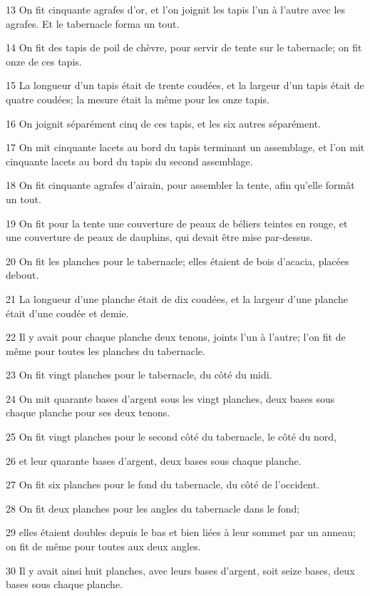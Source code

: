 \par 13 On fit cinquante agrafes d'or, et l'on joignit les tapis l'un à l'autre avec les agrafes. Et le tabernacle forma un tout.
\par 14 On fit des tapis de poil de chèvre, pour servir de tente sur le tabernacle; on fit onze de ces tapis.
\par 15 La longueur d'un tapis était de trente coudées, et la largeur d'un tapis était de quatre coudées; la mesure était la même pour les onze tapis.
\par 16 On joignit séparément cinq de ces tapis, et les six autres séparément.
\par 17 On mit cinquante lacets au bord du tapis terminant un assemblage, et l'on mit cinquante lacets au bord du tapis du second assemblage.
\par 18 On fit cinquante agrafes d'airain, pour assembler la tente, afin qu'elle formât un tout.
\par 19 On fit pour la tente une couverture de peaux de béliers teintes en rouge, et une couverture de peaux de dauphins, qui devait être mise par-dessus.
\par 20 On fit les planches pour le tabernacle; elles étaient de bois d'acacia, placées debout.
\par 21 La longueur d'une planche était de dix coudées, et la largeur d'une planche était d'une coudée et demie.
\par 22 Il y avait pour chaque planche deux tenons, joints l'un à l'autre; l'on fit de même pour toutes les planches du tabernacle.
\par 23 On fit vingt planches pour le tabernacle, du côté du midi.
\par 24 On mit quarante bases d'argent sous les vingt planches, deux bases sous chaque planche pour ses deux tenons.
\par 25 On fit vingt planches pour le second côté du tabernacle, le côté du nord,
\par 26 et leur quarante bases d'argent, deux bases sous chaque planche.
\par 27 On fit six planches pour le fond du tabernacle, du côté de l'occident.
\par 28 On fit deux planches pour les angles du tabernacle dans le fond;
\par 29 elles étaient doubles depuis le bas et bien liées à leur sommet par un anneau; on fit de même pour toutes aux deux angles.
\par 30 Il y avait ainsi huit planches, avec leurs bases d'argent, soit seize bases, deux bases sous chaque planche.
